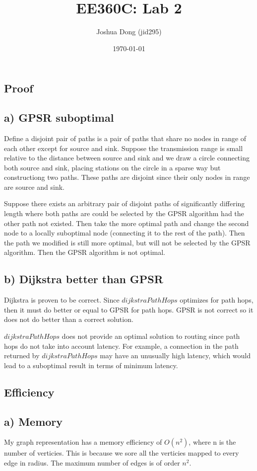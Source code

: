 \documentclass{article}
\begin{document}
\title{EE360C: Lab 2}
\author{Joshua Dong (jid295)}
\date{\today}
\maketitle

\subsection*{Proof}
\subsection*{a) GPSR suboptimal}
Define a disjoint pair of paths is a pair of paths that share no nodes in
range of each other except for source and sink. Suppose the transmission range
is small relative to the distance between source and sink and we draw a circle
connecting both source and sink, placing stations on the circle in a sparse
way but constructiong two paths. These paths are disjoint since their only
nodes in range are source and sink.

Suppose there exists an arbitrary pair of disjoint paths of significantly
differing length where both paths are could be selected by the GPSR algorithm
had the other path not existed. Then take the more optimal path and change the
second node to a locally suboptimal node (connecting it to the rest of the
path). Then the path we modified is still more optimal, but will not be
selected by the GPSR algorithm. Then the GPSR algorithm is not optimal.

\subsection*{b) Dijkstra better than GPSR}
Dijkstra is proven to be correct. Since $dijkstraPathHops$ optimizes for path
hops, then it must do better or equal to GPSR for path hops. GPSR is not correct
so it does not do better than a correct solution.

$dijkstraPathHops$ does not provide an optimal solution to routing since path
hops do not take into account latency. For example, a connection in the path
returned by $dijkstraPathHops$ may have an unusually high latency, which would
lead to a suboptimal result in terms of minimum latency.


\subsection*{Efficiency}
\subsection*{a) Memory}
My graph representation has a memory efficiency of $O(n^2)$, where n is the
number of verticies. This is because we sore all the verticies mapped to every
edge in radius. The maximum number of edges is of order $n^2$.
\end{document}
